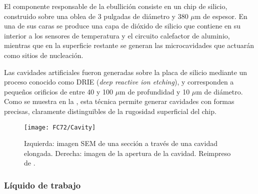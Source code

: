 
%

El componente responsable de la ebullici\'on consiste en un chip de silicio, construido sobre una oblea de 3 pulgadas de di\'ametro y 380 $\mu$m de espesor. En una de sus caras se produce una capa de di\'oxido de silicio que contiene en su interior a los sensores de temperatura y el circuito calefactor de aluminio, mientras que en la superficie restante se generan las microcavidades que actuar\'an como sitios de nucleaci\'on.

Las cavidades artificiales fueron generadas sobre la placa de silicio mediante un proceso conocido como DRIE (\emph{deep reactive ion etching}), y corresponden a peque\~nos orificios de entre 40 y 100 $\mu$m de profundidad y 10 $\mu$m de di\'ametro. Como se muestra en la , esta t\'ecnica permite generar cavidades con formas precisas, claramente distinguibles de la rugosidad superficial del chip.

\begin{figure}[ht]
	\centering
	\texttt{[image: FC72/Cavity]}
	\caption{Izquierda: imagen SEM de una secci\'on a trav\'es de una cavidad elongada. Derecha: imagen de la apertura de la cavidad. Reimpreso de \cite{hutter_experimental_2010}.}
	\label{fig:cavidad}
\end{figure}


\subsubsection{L\'iquido de trabajo}


